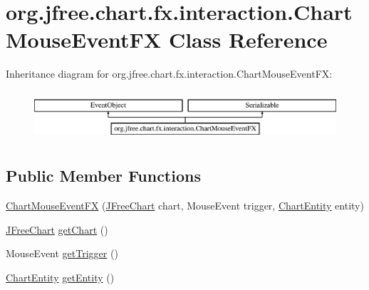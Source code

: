 \hypertarget{classorg_1_1jfree_1_1chart_1_1fx_1_1interaction_1_1_chart_mouse_event_f_x}{}\section{org.\+jfree.\+chart.\+fx.\+interaction.\+Chart\+Mouse\+Event\+FX Class Reference}
\label{classorg_1_1jfree_1_1chart_1_1fx_1_1interaction_1_1_chart_mouse_event_f_x}
Inheritance diagram for org.\+jfree.\+chart.\+fx.\+interaction.\+Chart\+Mouse\+Event\+FX\+:\begin{figure}[H]
\begin{center}
\leavevmode
\includegraphics[height=1.860465cm]{classorg_1_1jfree_1_1chart_1_1fx_1_1interaction_1_1_chart_mouse_event_f_x}
\end{center}
\end{figure}
\subsection*{Public Member Functions}
\begin{DoxyCompactItemize}
\item 
\mbox{\hyperlink{classorg_1_1jfree_1_1chart_1_1fx_1_1interaction_1_1_chart_mouse_event_f_x_a369c3e4f3d7e5ce3aec68a64e9ecc2af}{Chart\+Mouse\+Event\+FX}} (\mbox{\hyperlink{classorg_1_1jfree_1_1chart_1_1_j_free_chart}{J\+Free\+Chart}} chart, Mouse\+Event trigger, \mbox{\hyperlink{classorg_1_1jfree_1_1chart_1_1entity_1_1_chart_entity}{Chart\+Entity}} entity)
\item 
\mbox{\hyperlink{classorg_1_1jfree_1_1chart_1_1_j_free_chart}{J\+Free\+Chart}} \mbox{\hyperlink{classorg_1_1jfree_1_1chart_1_1fx_1_1interaction_1_1_chart_mouse_event_f_x_a541eb1f108c505af7afab1e5c67b3a53}{get\+Chart}} ()
\item 
Mouse\+Event \mbox{\hyperlink{classorg_1_1jfree_1_1chart_1_1fx_1_1interaction_1_1_chart_mouse_event_f_x_a05a72468115fe95df8b8a17058513d8a}{get\+Trigger}} ()
\item 
\mbox{\hyperlink{classorg_1_1jfree_1_1chart_1_1entity_1_1_chart_entity}{Chart\+Entity}} \mbox{\hyperlink{classorg_1_1jfree_1_1chart_1_1fx_1_1interaction_1_1_chart_mouse_event_f_x_ad22c10e5e7dfdee4439ae9d7486572c9}{get\+Entity}} ()
\end{DoxyCompactItemize}


